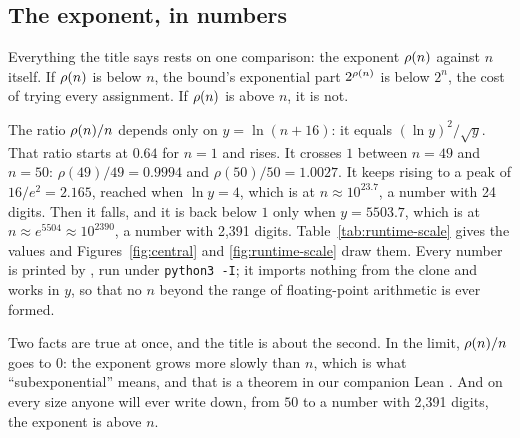 \subsection{The exponent, in numbers}
\label{sec:statement-numbers}

Everything the title says rests on one comparison: the exponent $\rhon$
against $n$ itself. If $\rhon$ is below $n$, the bound's exponential
part $2^{\rhon}$ is below $2^n$, the cost of trying every assignment.
If $\rhon$ is above $n$, it is not.

The ratio $\rhon / n$ depends only on $y = \ln(n+16)$: it equals
$(\ln y)^2 / \sqrt{y}$. That ratio starts at $0.64$ for $n = 1$ and
rises. It crosses $1$ between $n = 49$ and $n = 50$: $\rho(49)/49 =
0.9994$ and $\rho(50)/50 = 1.0027$. It keeps rising to a peak of
$16/e^2 = 2.165$, reached when $\ln y = 4$, which is at $n \approx
10^{23.7}$, a number with 24 digits. Then it falls, and it is back below
$1$ only when $y = 5503.7$, which is at $n \approx e^{5504} \approx
10^{2390}$, a number with 2,391 digits.
Table~\ref{tab:runtime-scale} gives the values and
Figures~\ref{fig:central} and \ref{fig:runtime-scale} draw them. Every
number is printed by , run
under \texttt{python3 -I}; it imports nothing from the clone and works
in $y$, so that no $n$ beyond the range of floating-point arithmetic is
ever formed.

Two facts are true at once, and the title is about the second. In the
limit, $\rhon / n$ goes to $0$: the exponent grows more slowly than
$n$, which is what ``subexponential'' means, and that is a theorem in
our companion Lean . And on every size anyone
will ever write down, from $50$ to a number with 2,391 digits, the
exponent is above $n$.

\begin{table}[htbp]
\centering
\caption{The verified exponent compared with $n$. The second column is
the ratio $\rhon/n$; where it is above $1$, the bound's exponential
part $2^{\rhon}$ (with $A = 1$) is above $2^n$, the cost of trying
every assignment. The third column is $\rhon$ itself. $\rhon =
n(\ln\ln(n+16))^2/\sqrt{\ln(n+16)}$, the comparator's
\texttt{runtimeScale} (lines 132--134), natural logarithms. Regenerate:
\texttt{python3 -I paper3/scripts/runtime\_scale.py}.}
\label{tab:runtime-scale}

\end{table}


